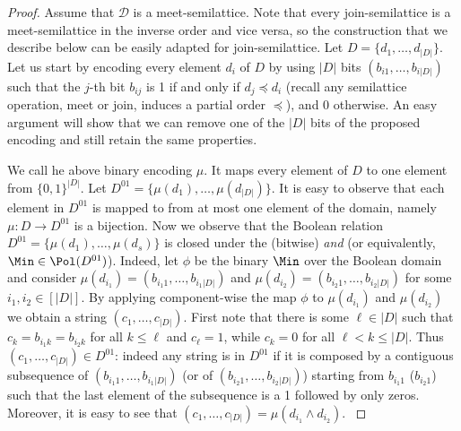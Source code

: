 \documentclass[11pt]{article}
\begin{document}
\begin{proof}
    Assume that $\mathcal{D}$ is a meet-semilattice. Note that every join-semilattice is a meet-semilattice in the inverse order and vice versa, so the construction that we describe below can be easily adapted for join-semilattice. Let $D=\{d_1,\ldots,d_{|D|}\}$. Let us start by encoding every element $d_i$ of $D$ by using $|D|$ bits $(b_{i1},\ldots,b_{i{|D|}})$ such that the $j$-th bit $b_{ij}$ is 1 if and only if $d_{j}\preceq d_i$ (recall any semilattice operation, meet or join, induces a partial order $\preceq$), and $0$ otherwise. An easy argument will show that we can remove one of the $|D|$ bits of the proposed encoding and still retain the same properties.  
    
    
    {We call he above binary encoding $\mu$. It maps every element of $D$ to one element from $\{0,1\}^{|D|}$. Let $D^{01}=\{\mu(d_1),\ldots,\mu(d_{|D|})\}$. It is easy to observe that each element in $D^{01}$ is mapped to from at most one element of the domain, namely $\mu:D\rightarrow D^{01}$ is a bijection. Now we observe that the Boolean relation $D^{01} = \{\mu(d_1), \dots, \mu(d_s)\}$ is closed under the (bitwise) \textit{and} (or equivalently, $\Min \in \Pol(D^{01})$). Indeed, let $\phi$ be the binary $\Min$ over the Boolean domain and consider $\mu(d_{i_1}) = (b_{i_1 1}, \dots, b_{i_1 |D|})$ and $\mu(d_{i_2}) = (b_{i_2 1}, \dots, b_{i_2 |D|})$ for some $i_1, i_2 \in [|D|]$. By applying component-wise the map $\phi$ to $\mu(d_{i_1})$ and $\mu(d_{i_2})$ we obtain a string $(c_1, \dots, c_{|D|})$. First note that there is some $\ell \in {|D|}$ such that $c_k = b_{i_1 k} = b_{i_2 k}$ for all $k \leq \ell$ and $c_{\ell} = 1$, while $c_k = 0$ for all $\ell < k \leq |D|$. Thus $(c_1, \dots, c_{|D|}) \in D^{01}$: indeed any string is in $D^{01}$ if it is composed by a contiguous subsequence of $(b_{i_1 1}, \dots, b_{i_1 |D|})$ (or of $(b_{i_2 1}, \dots, b_{i_2 |D|})$) starting from $b_{i_1 1}$ ($b_{i_2 1}$) such that the last element of the subsequence is a 1 followed by only zeros. Moreover, it is easy to see that $(c_1, \dots, c_{|D|}) = \mu(d_{i_1} \wedge d_{i_2})$.
    }


\end{proof}
\end{document}
